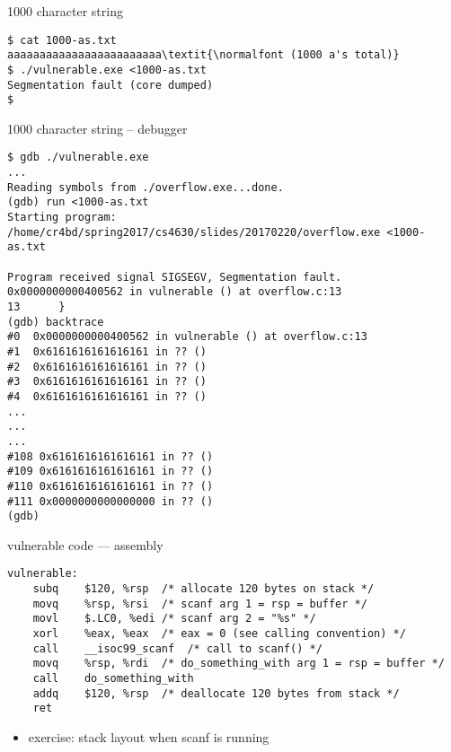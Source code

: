 \begin{frame}[fragile,label=charSegfault]{1000 character string}
\begin{Verbatim}[fontsize=\fontsize{9}{10}\selectfont,commandchars=\\\{\}]
$ cat 1000-as.txt
aaaaaaaaaaaaaaaaaaaaaaaa\textit{\normalfont (1000 a's total)}
$ ./vulnerable.exe <1000-as.txt
Segmentation fault (core dumped)
$ 
\end{Verbatim}
\end{frame}


\begin{frame}[fragile,label=charDebug]{1000 character string -- debugger}
\begin{Verbatim}[fontsize=\fontsize{9}{10}\selectfont,commandchars=\\\[\]]
$ gdb ./vulnerable.exe 
...
Reading symbols from ./overflow.exe...done.
(gdb) run <1000-as.txt 
Starting program: /home/cr4bd/spring2017/cs4630/slides/20170220/overflow.exe <1000-as.txt

Program received signal SIGSEGV, Segmentation fault.
0x0000000000400562 in vulnerable () at overflow.c:13
13      }
(gdb) backtrace
#0  0x0000000000400562 in vulnerable () at overflow.c:13
#1  0x6161616161616161 in ?? ()
#2  0x6161616161616161 in ?? ()
#3  0x6161616161616161 in ?? ()
#4  0x6161616161616161 in ?? ()
...
...
...
#108 0x6161616161616161 in ?? ()
#109 0x6161616161616161 in ?? ()
#110 0x6161616161616161 in ?? ()
#111 0x0000000000000000 in ?? ()
(gdb) 
\end{Verbatim}
\end{frame}

\begin{frame}[fragile,label=vulnAsm]{vulnerable code --- assembly}
\lstset{language=myasm,style=small}
\begin{lstlisting}
vulnerable:
    subq	$120, %rsp  /* allocate 120 bytes on stack */
    movq	%rsp, %rsi  /* scanf arg 1 = rsp = buffer */
    movl	$.LC0, %edi /* scanf arg 2 = "%s" */
    xorl    %eax, %eax  /* eax = 0 (see calling convention) */
    call	__isoc99_scanf  /* call to scanf() */
    movq	%rsp, %rdi  /* do_something_with arg 1 = rsp = buffer */
    call	do_something_with
    addq	$120, %rsp  /* deallocate 120 bytes from stack */
    ret
\end{lstlisting}
\begin{itemize}
\item<2> exercise: stack layout when scanf is running
\end{itemize}
\end{frame}

